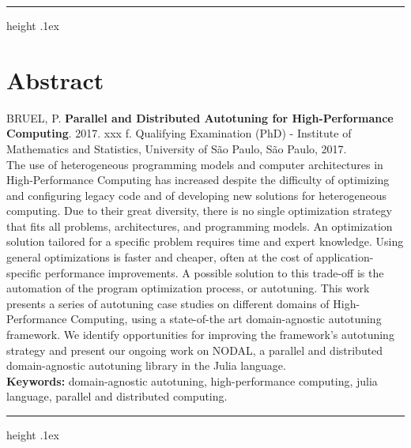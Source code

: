 \documentclass[12pt,twoside,a4paper]{book}
\makeatletter
\def\thickhrulefill{\leavevmode \leaders \hrule height .1ex \hfill \kern \z@}
\makeatother
\begin{document}
\vspace*{1cm}%
\thickhrulefill

\chapter*{Abstract}
\noindent BRUEL, P. \textbf{Parallel and Distributed Autotuning for High-Performance Computing}.
2017. xxx f.
Qualifying Examination (PhD) - Institute of Mathematics and Statistics,
University of São Paulo, São Paulo, 2017.
\\
The use of heterogeneous programming models and computer architectures in
High-Performance Computing has increased despite the difficulty of optimizing
and configuring legacy code and of developing new solutions for heterogeneous
computing.  Due to their great diversity, there is no single optimization
strategy that fits all problems, architectures, and programming models.  An
optimization solution tailored for a specific problem requires time and expert
knowledge. Using general optimizations is faster and cheaper, often at the cost
of application-specific performance improvements. A possible solution to this
trade-off is the automation of the program optimization process, or autotuning.
This work presents a series of autotuning case studies on different domains of
High-Performance Computing, using a state-of-the art domain-agnostic autotuning
framework. We identify opportunities for improving the framework's autotuning
strategy and present our ongoing work on NODAL, a parallel and distributed
domain-agnostic autotuning library in the Julia language.
\\

\noindent \textbf{Keywords:} domain-agnostic autotuning, high-performance computing, julia language, parallel and distributed computing.

\vspace*{1cm}%
\thickhrulefill

\newpage
\tableofcontents    %
\end{document}
